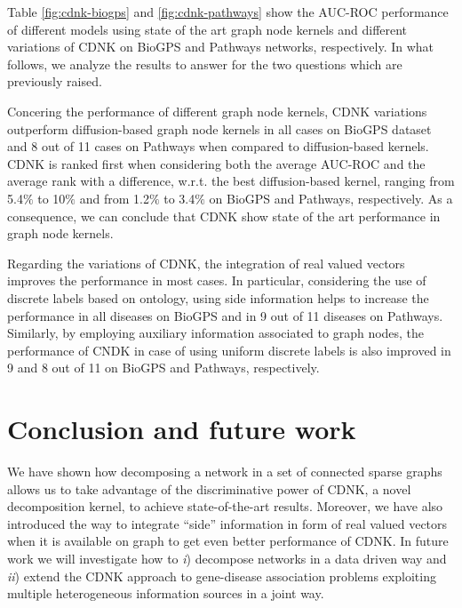\documentclass[review]{elsarticle}
\begin{document}
Table \ref{fig:cdnk-biogps} and \ref{fig:cdnk-pathways} show the AUC-ROC performance of different models using state of the art graph node kernels and different variations of CDNK on BioGPS and Pathways networks, respectively. In what follows, we analyze the results to answer for the two questions which are previously raised.

Concering the performance of different graph node kernels, CDNK variations outperform diffusion-based graph node kernels in all cases on BioGPS dataset and 8 out of 11 cases on Pathways when compared to diffusion-based kernels. CDNK is ranked first when considering both the average AUC-ROC and the average rank with a difference, w.r.t. the best diffusion-based kernel, ranging from 5.4$\%$ to 10$\%$ and from 1.2$\%$ to 3.4$\%$ on BioGPS and Pathways, respectively. As a consequence, we can conclude that CDNK show state of the art performance in graph node kernels.

Regarding the variations of CDNK, the integration of real valued vectors improves the performance in most cases. In particular, considering the use of discrete labels based on ontology, using side information helps to increase the performance in all diseases on BioGPS and in 9 out of 11 diseases on Pathways. Similarly, by employing auxiliary information associated to graph nodes, the performance of CNDK in case of using uniform discrete labels is also improved in 9 and 8 out of 11 on BioGPS and Pathways, respectively.
\section{Conclusion and future work}
We have shown how decomposing a network in a set of connected sparse graphs allows us to take advantage of the discriminative power of CDNK, a novel decomposition kernel, to achieve state-of-the-art results. Moreover, we have also introduced the way to integrate ``side'' information in form of real valued vectors when it is available on graph to get even better performance of CDNK. In future work we will investigate how to \textit{i}) decompose networks in a data driven way and \textit{ii}) extend the CDNK approach to gene-disease association problems exploiting multiple heterogeneous information sources in a joint way.
\end{document}
